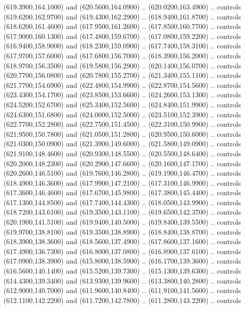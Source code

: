 {\begin{scope}[y=0.80pt, x=0.80pt, yscale=-1, xscale=1, inner sep=0pt, outer sep=0pt, #1]
      (619.3900,164.1000) and (620.5600,164.0900) .. (620.0200,163.4900) .. controls
      (619.6200,162.9700) and (619.4300,162.2900) .. (618.9400,161.8700) .. controls
      (618.6200,161.4600) and (617.9500,161.2600) .. (617.8500,160.7700) .. controls
      (617.9000,160.1300) and (617.4800,159.6700) .. (617.0800,159.2200) .. controls
      (616.9400,158.9000) and (618.2300,159.0900) .. (617.7400,158.3100) .. controls
      (617.9700,157.6000) and (617.6800,156.7000) .. (618.3900,156.2000) .. controls
      (618.9700,156.3500) and (619.5800,156.2900) .. (620.1400,156.0700) .. controls
      (620.7700,156.0800) and (620.7800,155.2700) .. (621.3400,155.1100) .. controls
      (621.7700,154.6900) and (622.4800,154.9900) .. (622.8700,154.5600) .. controls
      (623.4300,154.1700) and (623.8500,153.6600) .. (624.2600,153.1300) .. controls
      (624.5200,152.6700) and (625.3400,152.5600) .. (624.8400,151.9900) .. controls
      (624.6300,151.6800) and (624.0000,152.5000) .. (623.5100,152.3900) .. controls
      (622.7700,152.2800) and (622.7500,151.4500) .. (622.3100,150.9900) .. controls
      (621.9500,150.7800) and (621.0500,151.2800) .. (620.9500,150.6000) .. controls
      (621.0300,150.0900) and (621.3900,149.6000) .. (621.5800,149.0900) .. controls
      (621.9100,148.4600) and (620.9300,148.5500) .. (620.5500,148.6400) .. controls
      (620.2000,148.2300) and (620.2900,147.6600) .. (620.1600,147.1700) .. controls
      (620.2600,146.5100) and (619.7600,146.2800) .. (619.1900,146.4700) .. controls
      (618.4900,146.3600) and (617.9900,147.2100) .. (617.3100,146.9900) .. controls
      (617.3600,146.4600) and (617.6700,145.9800) .. (617.3800,145.4400) .. controls
      (617.1300,144.8500) and (617.7400,144.4300) .. (618.0500,143.9900) .. controls
      (618.7200,143.6100) and (619.3500,143.1100) .. (619.6500,142.3700) .. controls
      (620.1900,141.5100) and (619.9400,140.5000) .. (619.8400,139.5500) .. controls
      (619.9700,138.8100) and (619.3500,138.8900) .. (618.8400,138.8700) .. controls
      (618.3900,138.3600) and (618.5600,137.4900) .. (617.8600,137.1600) .. controls
      (617.4900,136.7300) and (616.8000,137.0800) .. (616.8900,137.6100) .. controls
      (617.0900,138.3900) and (615.8000,138.5900) .. (616.1700,139.3600) .. controls
      (616.5600,140.1400) and (615.5200,139.7300) .. (615.1300,139.6300) .. controls
      (614.4300,139.3400) and (613.9300,139.9600) .. (613.3800,140.2800) .. controls
      (612.9000,140.7000) and (611.9600,140.8400) .. (611.9100,141.5600) .. controls
      (612.1100,142.2200) and (611.7200,142.7800) .. (611.2800,143.2200) .. controls

\end{scope}}
